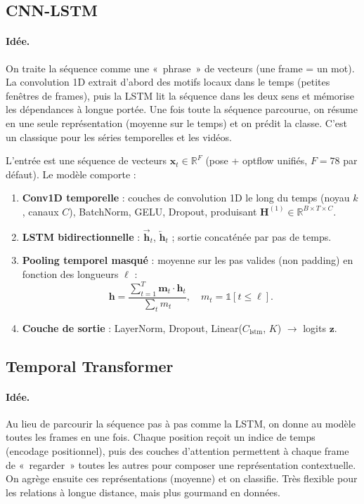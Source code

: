 \documentclass[11pt,a4paper]{article}
\begin{document}
\subsection{CNN-LSTM}

\paragraph{Idée.} On traite la séquence comme une «~phrase~» de vecteurs (une frame = un mot). La convolution 1D extrait d’abord des motifs locaux dans le temps (petites fenêtres de frames), puis la LSTM lit la séquence dans les deux sens et mémorise les dépendances à longue portée. Une fois toute la séquence parcourue, on résume en une seule représentation (moyenne sur le temps) et on prédit la classe. C’est un classique pour les séries temporelles et les vidéos.

L’entrée est une séquence de vecteurs $\mathbf{x}_t \in \mathbb{R}^F$ (pose + optflow unifiés, $F=78$ par défaut). Le modèle comporte :
\begin{enumerate}
  \item \textbf{Conv1D temporelle} : couches de convolution 1D le long du temps (noyau $k$, canaux $C$), BatchNorm, GELU, Dropout, produisant $\mathbf{H}^{(1)} \in \mathbb{R}^{B \times T \times C}$.
  \item \textbf{LSTM bidirectionnelle} : $\overrightarrow{\mathbf{h}}_t$, $\overleftarrow{\mathbf{h}}_t$ ; sortie concaténée par pas de temps.
  \item \textbf{Pooling temporel masqué} : moyenne sur les pas valides (non padding) en fonction des longueurs $\ell$ :
  \begin{equation}
    \mathbf{h} = \frac{\sum_{t=1}^{T} \mathbf{m}_t \cdot \mathbf{h}_t}{\sum_{t} m_t}, \quad m_t = \mathbb{1}[t \le \ell].
  \end{equation}
  \item \textbf{Couche de sortie} : LayerNorm, Dropout, Linear($C_{\mathrm{lstm}}$, $K$) $\to$ logits $\mathbf{z}$.
\end{enumerate}

\subsection{Temporal Transformer}

\paragraph{Idée.} Au lieu de parcourir la séquence pas à pas comme la LSTM, on donne au modèle toutes les frames en une fois. Chaque position reçoit un indice de temps (encodage positionnel), puis des couches d’attention permettent à chaque frame de «~regarder~» toutes les autres pour composer une représentation contextuelle. On agrège ensuite ces représentations (moyenne) et on classifie. Très flexible pour les relations à longue distance, mais plus gourmand en données.
\end{document}
